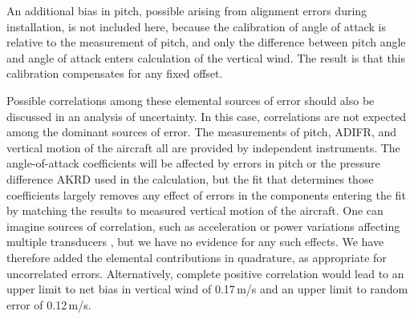 \documentclass[12pt,twoside,english]{article}\usepackage[]{graphicx}\usepackage[]{color}
\begin{document}
{{An additional bias in pitch, possible arising from alignment errors during installation, is not included here, because the calibration of angle of attack is relative to the measurement of pitch, and only the difference between pitch angle and angle of attack enters calculation of the vertical wind. The result is that this calibration compensates for any fixed offset.

Possible correlations among these elemental sources of error should also be discussed in an analysis of uncertainty. In this case, correlations are not expected among the dominant sources of error. The measurements of pitch, ADIFR, and vertical motion of the aircraft all are provided by independent instruments. The angle-of-attack coefficients will be affected by errors in pitch or the pressure difference AKRD used in the calculation, but the fit that determines those coefficients largely removes any effect of errors in the components entering the fit by matching the results to measured vertical motion of the aircraft. One can imagine sources of correlation, such as acceleration or power variations affecting multiple transducers , but we have no evidence for any such effects. We have therefore added the elemental contributions in quadrature, as appropriate for uncorrelated errors. Alternatively, complete positive correlation would lead to an upper limit to net bias in vertical wind of 0.17\,m/s and an upper limit to random error of 0.12\,m/s. 


}}
\end{document}

